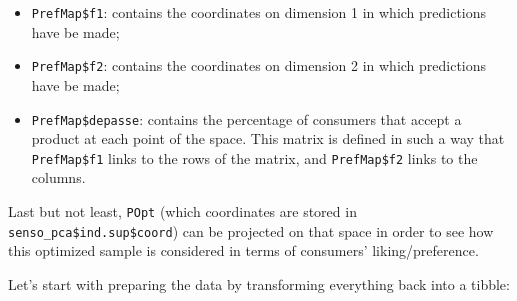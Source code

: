 \documentclass[
]{krantz}
\makeatletter
\newenvironment{Shaded}{\begin{snugshade}}{\end{snugshade}}
\newcommand{\AttributeTok}[1]{\textcolor[rgb]{0.61,0.61,0.61}{#1}}
\newcommand{\DecValTok}[1]{\textcolor[rgb]{0.06,0.06,0.06}{#1}}
\newcommand{\FunctionTok}[1]{\textcolor[rgb]{0,0,0}{#1}}
\newcommand{\NormalTok}[1]{#1}
\newcommand{\OtherTok}[1]{\textcolor[rgb]{0.37,0.37,0.37}{#1}}
\newcommand{\SpecialCharTok}[1]{\textcolor[rgb]{0,0,0}{#1}}
\newcommand{\StringTok}[1]{\textcolor[rgb]{0.5,0.5,0.5}{#1}}
\providecommand{\tightlist}{%
  \setlength{\itemsep}{0pt}\setlength{\parskip}{0pt}}
\newenvironment{kframe}{%
\medskip{}
\setlength{\fboxsep}{.8em}
 \def\at@end@of@kframe{}%
 \ifinner\ifhmode%
  \def\at@end@of@kframe{\end{minipage}}%
  \begin{minipage}{\columnwidth}%
 \fi\fi%
 \def\FrameCommand##1{\hskip\@totalleftmargin \hskip-\fboxsep
 \colorbox{shadecolor}{##1}\hskip-\fboxsep
     \hskip-\linewidth \hskip-\@totalleftmargin \hskip\columnwidth}%
 \MakeFramed {\advance\hsize-\width
   \@totalleftmargin\z@ \linewidth\hsize
   \@setminipage}}%
 {\par\unskip\endMakeFramed%
 \at@end@of@kframe}
\renewenvironment{Shaded}{\begin{kframe}}{\end{kframe}}
\makeatother
\begin{document}
\begin{itemize}
\tightlist
\item
  \texttt{PrefMap\$f1}: contains the coordinates on dimension 1 in which predictions have be made;
\item
  \texttt{PrefMap\$f2}: contains the coordinates on dimension 2 in which predictions have be made;
\item
  \texttt{PrefMap\$depasse}: contains the percentage of consumers that accept a product at each point of the space. This matrix is defined in such a way that \texttt{PrefMap\$f1} links to the rows of the matrix, and \texttt{PrefMap\$f2} links to the columns.
\end{itemize}

Last but not least, \texttt{POpt} (which coordinates are stored in \texttt{senso\_pca\$ind.sup\$coord}) can be projected on that space in order to see how this optimized sample is considered in terms of consumers' liking/preference.

Let's start with preparing the data by transforming everything back into a tibble:

\begin{Shaded}
\end{Shaded}
\end{document}
